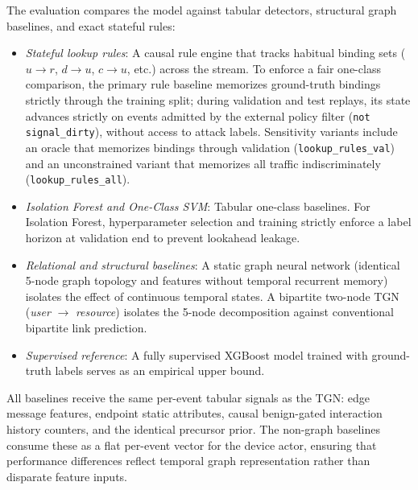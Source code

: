 The evaluation compares the model against tabular detectors, structural graph baselines, and
exact stateful rules:
\begin{itemize}
  \item \textit{Stateful lookup rules}: A causal rule engine that tracks habitual binding sets
  ($u \rightarrow r$, $d \rightarrow u$, $c \rightarrow u$, etc.) across the stream. To enforce
  a fair one-class comparison, the primary rule baseline memorizes ground-truth bindings strictly
  through the training split; during validation and test replays, its state advances strictly on
  events admitted by the external policy filter (\texttt{not signal\_dirty}), without access to
  attack labels. Sensitivity variants include an oracle that memorizes bindings through validation
  (\texttt{lookup\_rules\_val}) and an unconstrained variant that memorizes all traffic indiscriminately
  (\texttt{lookup\_rules\_all}).
  \item \textit{Isolation Forest and One-Class SVM}: Tabular one-class baselines. For Isolation
  Forest, hyperparameter selection and training strictly enforce a label horizon at validation end
  to prevent lookahead leakage.
  \item \textit{Relational and structural baselines}: A static graph neural network (identical 5-node
  graph topology and features without temporal recurrent memory) isolates the effect of continuous
  temporal states. A bipartite two-node TGN (\textit{user} $\rightarrow$ \textit{resource}) isolates
  the 5-node decomposition against conventional bipartite link prediction.
  \item \textit{Supervised reference}: A fully supervised XGBoost model trained with ground-truth
  labels serves as an empirical upper bound.
\end{itemize}
All baselines receive the same per-event tabular signals as the TGN: edge message features,
endpoint static attributes, causal benign-gated interaction history counters, and the identical
precursor prior. The non-graph baselines consume these as a flat per-event vector for the device actor,
ensuring that performance differences reflect temporal graph representation rather than disparate
feature inputs.
